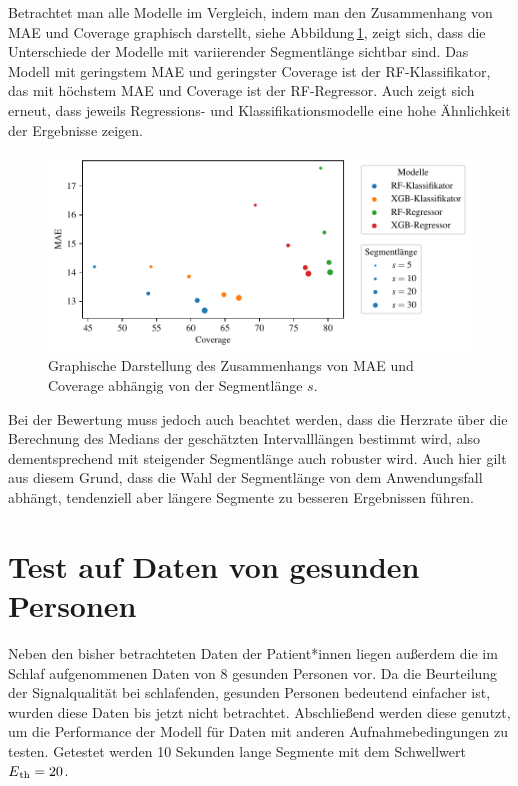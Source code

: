  Betrachtet man alle Modelle im Vergleich, indem man den Zusammenhang von \ac{MAE} und Coverage graphisch darstellt, siehe Abbildung\,\ref{fig:segment-length-variation}, zeigt sich, dass die Unterschiede der Modelle mit variierender Segmentlänge sichtbar sind. Das Modell mit geringstem \ac{MAE} und geringster Coverage ist der \ac{RF}-Klassifikator, das mit höchstem \ac{MAE} und Coverage ist der \ac{RF}-Regressor. Auch zeigt sich erneut, dass jeweils Regressions- und Klassifikationsmodelle eine hohe Ähnlichkeit der Ergebnisse zeigen. %
 
 \begin{figure}[H]
	\centering
	\includegraphics[scale=0.95]{pic/segment-length-variation.pdf}
 	\caption{Graphische Darstellung des Zusammenhangs von \ac{MAE} und Coverage abhängig von der Segmentlänge $s$.}
 	\label{fig:segment-length-variation}
\end{figure}

 Bei der Bewertung muss jedoch auch beachtet werden, dass die Herzrate über die Berechnung des Medians der geschätzten Intervalllängen bestimmt wird, also dementsprechend mit steigender Segmentlänge auch robuster wird. Auch hier gilt aus diesem Grund, dass die Wahl der Segmentlänge von dem Anwendungsfall abhängt, tendenziell aber längere Segmente zu besseren Ergebnissen führen.

\section{Test auf Daten von gesunden Personen}

Neben den bisher betrachteten Daten der Patient*innen liegen außerdem die im Schlaf aufgenommenen Daten von 8 gesunden Personen vor. Da die Beurteilung der Signalqualität bei schlafenden, gesunden Personen bedeutend einfacher ist, wurden diese Daten bis jetzt nicht betrachtet. Abschließend werden diese genutzt, um die Performance der Modell für Daten mit anderen Aufnahmebedingungen zu testen. Getestet werden 10 Sekunden lange Segmente mit dem Schwellwert $E\textsubscript{th} = 20$.

